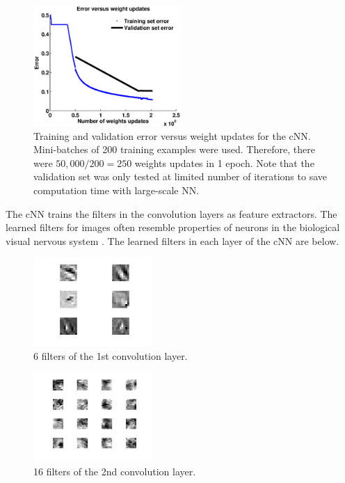 \documentclass[conference]{IEEEtran}
\begin{document}
\begin{figure}[H]
\centering
\includegraphics[width=0.5\textwidth]{erro.eps}
\caption{\scriptsize Training and validation error versus weight updates for the cNN. Mini-batches of 200 training examples were used. Therefore, there were $50,000/200=250$ weights updates in 1 epoch. Note that the validation set was only tested at limited number of iterations to save computation time with large-scale NN.}
\label{error}
\end{figure}

The cNN trains the filters in the convolution layers as feature extractors. The learned filters for images often resemble properties of neurons in the biological visual nervous system \cite{lecun-98}. The learned filters in each layer of the cNN are below.

\begin{figure}[H]
\centering
\includegraphics[width=0.4\textwidth]{feature1.png}
\caption{\scriptsize 6 filters of the 1st convolution layer.}
\label{feat1}
\end{figure}

\begin{figure}[H]
\centering
\includegraphics[width=0.4\textwidth]{feature2.png}
\caption{\scriptsize 16 filters of the 2nd convolution layer.}
\label{feat2}
\end{figure}
\end{document}
